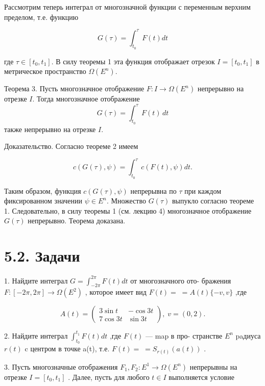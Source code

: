 \documentclass[8pt]{extarticle}
\begin{document}
Рассмотрим теперь интеграл от многозначной функции с переменным верхним пределом, т.е. функцию

\[
G\left( \tau \right)  = {\int }_{{t}_{0}}^{\tau }F\left( t\right) {dt}
\]

где \(\tau \in \left[ t_{0},t_{1}\right]\). В силу теоремы 1 эта функция отображает отрезок \(I = \left[ t_{0},t_{1}\right]\) в метрическое пространство \(\Omega \left( E^{n}\right)\).

Теорема 3. Пусть многозначное отображение \(F : I \rightarrow \Omega \left( E^{n}\right)\) непрерывно на отрезке \(I\). Тогда многозначное отображение
\[
G\left( \tau \right) = \int_{t_{0}}^{\tau} F\left( t\right)\,dt
\]
также непрерывно на отрезке \(I\).

Доказательство. Согласно теореме 2 имеем

\[
c\left( {G\left( \tau \right) ,\psi }\right)  = {\int }_{{t}_{0}}^{\tau }c\left( {F\left( t\right) ,\psi }\right) {dt}.
\]

Таким образом, функция \(c\left( G\left( \tau \right),\psi \right)\) непрерывна по \(\tau\) при каждом фиксированном значении \(\psi \in E^{n}\). Множество \(G\left( \tau \right)\) выпукло согласно теореме 1. Следовательно, в силу теоремы 1 (см. лекцию 4) многозначное отображение \(G\left( \tau \right)\) непрерывно. Теорема доказана.

\section*{5.2. Задачи}

1. Найдите интеграл \(G = {\int }_{-{2\pi }}^{2\pi }F\left( t\right) {dt}\) от многозначного ото- бражения \(F : \left\lbrack  {-{2\pi },{2\pi }}\right\rbrack   \rightarrow  \Omega \left( {E}^{2}\right)\) , которое имеет вид \(F\left( t\right)  = \; = A\left( t\right) \{  - v,v\}\) ,где

\[
A\left( t\right)  = \left( \begin{array}{cc} 3\sin t &  - \cos {3t} \\  7\cos {3t} & \sin {3t} \end{array}\right) ,\;v = \left( {0,2}\right) .
\]

2. Найдите интеграл \({\int }_{{t}_{0}}^{{t}_{1}}F\left( t\right) {dt}\) ,где \(F\left( t\right)\) — map в про- странстве \({E}^{n}\) paдиуса \(r\left( t\right)\) c центром в точке a(t), т.е. \(F\left( t\right)  = \; = {S}_{r\left( t\right) }\left( {a\left( t\right) }\right)\) .

3. Пусть многозначные отображения \({F}_{1},{F}_{2} : {E}^{1} \rightarrow  \Omega \left( {E}^{n}\right)\) непрерывны на отрезке \(I = \left\lbrack  {{t}_{0},{t}_{1}}\right\rbrack\) . Далее, пусть для любого \(t \in  I\) выполняется условие
\end{document}
